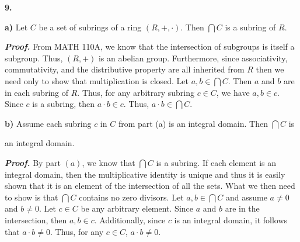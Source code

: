 \documentclass[12pt, a4paper]{article}
\begin{document}
\noindent\textbf{9.}

\vspace{4mm}

\begin{addmargin}[1.5em]{1.5em}

    \noindent\textbf{a)} Let $C$ be a set of subrings of a ring $(R,+,\cdot)$. Then $\bigcap C$ is a subring of $R$.
    
    \vspace{4mm}
    
    \noindent\textbf{\textit{Proof.}} From MATH 110A, we know that the intersection of subgroups is itself a subgroup. Thus, $(R,+)$ is an abelian group. Furthermore, since associativity, commutativity, and the distributive property are all inherited from $R$ then we need only to show that multiplication is closed. Let $a,b\in\bigcap C$. Then $a$ and $b$ are in each subring of $R$. Thus, for any arbitrary subring $c\in C$, we have $a,b\in c$. Since $c$ is a subring, then $a\cdot b\in c$. Thus, $a\cdot b\in\bigcap C$.\hspace{60mm}\square
    
    \vspace{4mm}
    
    \textbf{b)} Assume each subring $c$ in $C$ from part (a) is an integral domain. Then $\bigcap C$ is\par an integral domain.
    
    \vspace{4mm}
    
\end{addmargin}

\begin{addmargin}[1.5em]{1.5em}
    
    \textbf{\textit{Proof.}} By part $(a)$, we know that $\bigcap C$ is a subring. If each element is an integral domain, then the multiplicative identity is unique and thus it is easily shown that it is an element of the intersection of all the sets. What we then need to show is that $\bigcap C$ contains no zero divisors. Let $a,b\in\bigcap C$ and assume $a\neq 0$ and $b\neq 0$. Let $c\in C$ be any arbitrary element. Since $a$ and $b$ are in the intersection, then $a,b\in c$. Additionally, since $c$ is an integral domain, it follows that $a\cdot b\neq 0$. Thus, for any $c\in C$, $a\cdot b\neq 0$.\hspace{101mm}\square 
    
    \vspace{4mm}
    
\end{addmargin}
\end{document}
